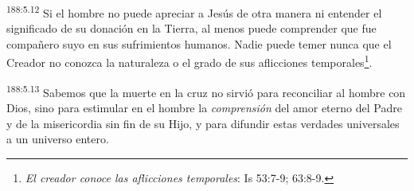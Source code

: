 \par 
\textsuperscript{188:5.12} Si el hombre no puede apreciar a Jesús de otra manera ni entender el significado de su donación en la Tierra, al menos puede comprender que fue compañero suyo en sus sufrimientos humanos. Nadie puede temer nunca que el Creador no conozca la naturaleza o el grado de sus aflicciones temporales\footnote{\textit{El creador conoce las aflicciones temporales}: Is 53:7-9; 63:8-9.}.

\par 
\textsuperscript{188:5.13} Sabemos que la muerte en la cruz no sirvió para reconciliar al hombre con Dios, sino para estimular en el hombre la \textit{comprensión} del amor eterno del Padre y de la misericordia sin fin de su Hijo, y para difundir estas verdades universales a un universo entero.